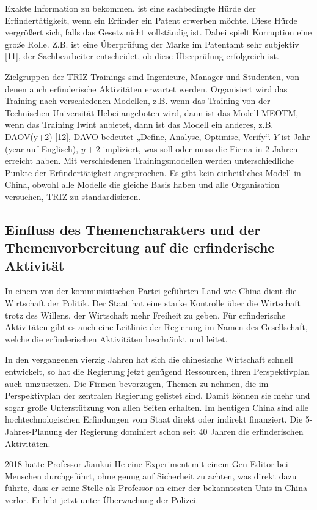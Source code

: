 \documentclass[11pt,a4paper]{article}
\begin{document}
Exakte Information zu bekommen, ist eine sachbedingte Hürde der
Erfindertätigkeit, wenn ein Erfinder ein Patent erwerben möchte. Diese Hürde
vergrößert sich, falls das Gesetz nicht vollständig ist. Dabei spielt
Korruption eine große Rolle. Z.B. ist eine Überprüfung der Marke im Patentamt
sehr subjektiv [11], der Sachbearbeiter entscheidet, ob diese Überprüfung
erfolgreich ist.

Zielgruppen der TRIZ-Trainings sind Ingenieure, Manager und Studenten, von
denen auch erfinderische Aktivitäten erwartet werden. Organisiert wird das
Training nach verschiedenen Modellen, z.B. wenn das Training von der
Technischen Universität Hebei angeboten wird, dann ist das Modell MEOTM, wenn
das Training Iwint anbietet, dann ist das Modell ein anderes, z.B.  DAOV(y+2)
[12], DAVO bedeutet „Define, Analyse, Optimise, Verify“.  $Y$ ist Jahr (year
auf Englisch), $y+2$ impliziert, was soll oder muss die Firma in 2 Jahren
erreicht haben. Mit verschiedenen Trainingsmodellen werden unterschiedliche
Punkte der Erfindertätigkeit angesprochen. Es gibt kein einheitliches Modell
in China, obwohl alle Modelle die gleiche Basis haben und alle Organisation
versuchen, TRIZ zu standardisieren.

\subsection{Einfluss des Themencharakters und der Themenvorbereitung auf
  die erfinderische Aktivität} 

In einem von der kommunistischen Partei geführten Land wie China dient die
Wirtschaft der Politik. Der Staat hat eine starke Kontrolle über die
Wirtschaft trotz des Willens, der Wirtschaft mehr Freiheit zu geben. Für
erfinderische Aktivitäten gibt es auch eine Leitlinie der Regierung im Namen
des Gesellschaft, welche die erfinderischen Aktivitäten beschränkt und leitet.

In den vergangenen vierzig Jahren hat sich die chinesische Wirtschaft schnell
entwickelt, so hat die Regierung jetzt genügend Ressourcen, ihren
Perspektivplan auch umzusetzen. Die Firmen bevorzugen, Themen zu nehmen, die
im Perspektivplan der zentralen Regierung gelistet sind. Damit können sie mehr
und sogar große Unterstützung von allen Seiten erhalten. Im heutigen China
sind alle hochtechnologischen Erfindungen vom Staat direkt oder indirekt
finanziert. Die 5-Jahres-Planung der Regierung dominiert schon seit 40 Jahren
die erfinderischen Aktivitäten.

2018 hatte Professor Jiankui He eine Experiment mit einem Gen-Editor bei
Menschen durchgeführt, ohne genug auf Sicherheit zu achten, was direkt dazu
führte, dass er seine Stelle als Professor an einer der bekanntesten Unis in
China verlor. Er lebt jetzt unter Überwachung der Polizei.
\end{document}
